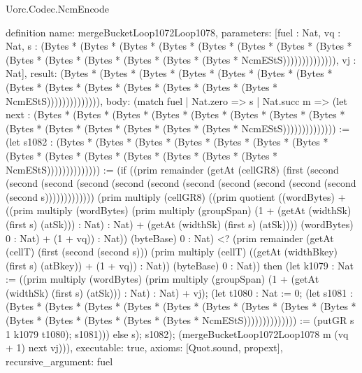 \begin{lexlean}{Uorc.Codec.NcmEncode}
\begin{semanticmodule}
definition{
  name: mergeBucketLoop1072Loop1078,
  parameters: [fuel : Nat, vq : Nat, s : (Bytes * (Bytes * (Bytes * (Bytes * (Bytes * (Bytes * (Bytes * (Bytes * (Bytes * (Bytes * (Bytes * (Bytes * (Bytes * (Bytes * NcmEStS)))))))))))))), vj : Nat],
  result: (Bytes * (Bytes * (Bytes * (Bytes * (Bytes * (Bytes * (Bytes * (Bytes * (Bytes * (Bytes * (Bytes * (Bytes * (Bytes * (Bytes * NcmEStS)))))))))))))),
  body: (match fuel
    | Nat.zero => s
    | Nat.succ m => (let next : (Bytes * (Bytes * (Bytes * (Bytes * (Bytes * (Bytes * (Bytes * (Bytes * (Bytes * (Bytes * (Bytes * (Bytes * (Bytes * (Bytes * NcmEStS)))))))))))))) := (let s1082 : (Bytes * (Bytes * (Bytes * (Bytes * (Bytes * (Bytes * (Bytes * (Bytes * (Bytes * (Bytes * (Bytes * (Bytes * (Bytes * (Bytes * NcmEStS)))))))))))))) := (if ((prim remainder (getAt (cellGR8) (first (second (second (second (second (second (second (second (second (second (second (second (second s))))))))))))) (prim multiply (cellGR8) ((prim quotient ((wordBytes) + ((prim multiply (wordBytes) (prim multiply (groupSpan) (1 + (getAt (widthSk) (first s) (atSk))) : Nat) : Nat) + (getAt (widthSk) (first s) (atSk)))) (wordBytes) 0 : Nat) + (1 + vq)) : Nat)) (byteBase) 0 : Nat) <? (prim remainder (getAt (cellT) (first (second (second s))) (prim multiply (cellT) ((getAt (widthBkey) (first s) (atBkey)) + (1 + vq)) : Nat)) (byteBase) 0 : Nat)) then (let k1079 : Nat := ((prim multiply (wordBytes) (prim multiply (groupSpan) (1 + (getAt (widthSk) (first s) (atSk))) : Nat) : Nat) + vj); (let t1080 : Nat := 0; (let s1081 : (Bytes * (Bytes * (Bytes * (Bytes * (Bytes * (Bytes * (Bytes * (Bytes * (Bytes * (Bytes * (Bytes * (Bytes * (Bytes * (Bytes * NcmEStS)))))))))))))) := (putGR s 1 k1079 t1080); s1081))) else s); s1082); (mergeBucketLoop1072Loop1078 m (vq + 1) next vj))),
  executable: true,
  axioms: [Quot.sound, propext],
  recursive_argument: fuel
}


\end{semanticmodule}
\end{lexlean}
